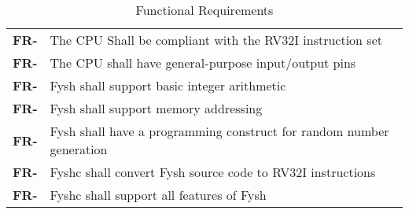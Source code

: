 \resetfyshcounter
\newcommand{\fr}[1]{
	\textbf{FR-\rc} & #1 \\
	\hline
}
\begin{table}[H]
	\begin{tabularx}{\textwidth}{| a | x |}
		\hline
		 &  \\
		\hline
		\fr{The CPU Shall be compliant with the RV32I instruction set}
		\fr{The CPU shall have general-purpose input/output pins}
		\fr{Fysh shall support basic integer arithmetic}
		\fr{Fysh shall support memory addressing}
		\fr{Fysh shall have a programming construct for random number generation}
		\fr{Fyshc shall convert Fysh source code to RV32I instructions}
		\fr{Fyshc shall support all features of Fysh}
	\end{tabularx}
	\caption{Functional Requirements}
\end{table}


